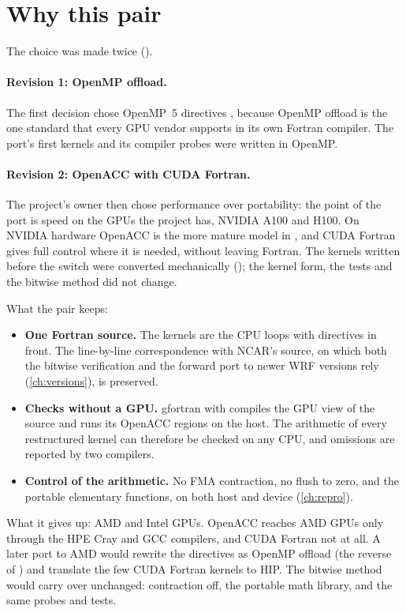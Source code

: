 \section{Why this pair}

The choice was made twice ().

\paragraph{Revision 1: OpenMP offload.} The first decision chose OpenMP~5  directives
\citep{openmp52}, because OpenMP offload is the one standard that every GPU vendor supports in its own Fortran
compiler. The port's first kernels and its compiler probes were written in OpenMP.

\paragraph{Revision 2: OpenACC with CUDA Fortran.} The project's owner then chose performance over portability: the
point of the port is speed on the GPUs the project has, NVIDIA A100 and H100. On NVIDIA hardware OpenACC is the more
mature model in , and CUDA Fortran gives full control where it is needed, without leaving Fortran.
The kernels written before the switch were converted mechanically (); the kernel form,
the tests and the bitwise method did not change.

What the pair keeps:
\begin{itemize}
  \item \textbf{One Fortran source.} The kernels are the CPU loops with directives in front. The line-by-line
    correspondence with NCAR's source, on which both the bitwise verification and the forward port to newer WRF
    versions rely (\cref{ch:versions}), is preserved.
  \item \textbf{Checks without a GPU.} gfortran with  compiles the GPU view of the source and runs its
    OpenACC regions on the host. The arithmetic of every restructured kernel can therefore be checked on any CPU, and
     omissions are reported by two compilers.
  \item \textbf{Control of the arithmetic.} No FMA contraction, no flush to zero, and the portable elementary
    functions, on both host and device (\cref{ch:repro}).
\end{itemize}
What it gives up: AMD and Intel GPUs. OpenACC reaches AMD GPUs only through the HPE Cray and GCC compilers, and CUDA
Fortran not at all. A later port to AMD would rewrite the directives as OpenMP offload (the reverse of
) and translate the few CUDA Fortran kernels to HIP. The bitwise method would carry over unchanged:
contraction off, the portable math library, and the same probes and tests.

